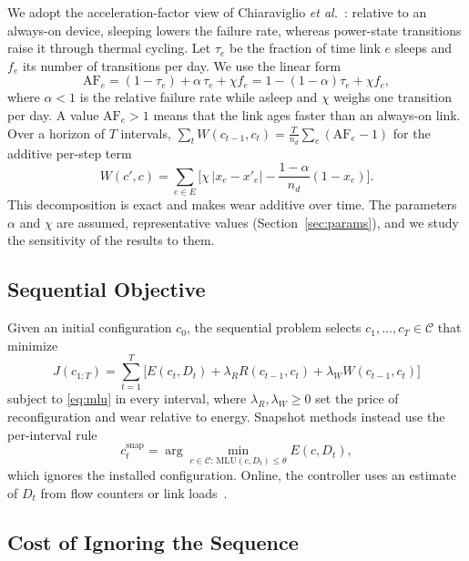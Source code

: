 \documentclass[journal]{IEEEtran}
\begin{document}
We adopt the acceleration-factor view of Chiaraviglio \emph{et al.}~\cite{chiaraviglio2015lifetime}: relative to an always-on device, sleeping lowers the failure rate, whereas power-state transitions raise it through thermal cycling. Let $\tau_e$ be the fraction of time link $e$ sleeps and $f_e$ its number of transitions per day. We use the linear form
\begin{equation}\label{eq:af}
\mathrm{AF}_e=(1-\tau_e)+\alpha\,\tau_e+\chi f_e=1-(1-\alpha)\tau_e+\chi f_e,
\end{equation}
where $\alpha<1$ is the relative failure rate while asleep and $\chi$ weighs one transition per day. A value $\mathrm{AF}_e>1$ means that the link ages faster than an always-on link. Over a horizon of $T$ intervals, $\sum_{t}W(c_{t-1},c_t)=\frac{T}{n_d}\sum_e(\mathrm{AF}_e-1)$ for the additive per-step term
\begin{equation}\label{eq:wear}
W(c',c)=\sum_{e\in E}\Big[\chi\,|x_e-x'_e|-\frac{1-\alpha}{n_d}(1-x_e)\Big].
\end{equation}
This decomposition is exact and makes wear additive over time. The parameters $\alpha$ and $\chi$ are assumed, representative values (Section~\ref{sec:params}), and we study the sensitivity of the results to them.

\subsection{Sequential Objective}

Given an initial configuration $c_0$, the sequential problem selects $c_1,\dots,c_T\in\mathcal{C}$ that minimize
\begin{equation}\label{eq:objective}
J(c_{1:T})=\sum_{t=1}^{T}\Big[E(c_t,D_t)+\lambda_R R(c_{t-1},c_t)+\lambda_W W(c_{t-1},c_t)\Big]
\end{equation}
subject to \eqref{eq:mlu} in every interval, where $\lambda_R,\lambda_W\ge0$ set the price of reconfiguration and wear relative to energy. Snapshot methods instead use the per-interval rule
\begin{equation}\label{eq:snapshot}
c^{\mathrm{snap}}_t=\arg\min_{c\in\mathcal{C}:\,\mathrm{MLU}(c,D_t)\le\theta}E(c,D_t),
\end{equation}
which ignores the installed configuration. Online, the controller uses an estimate of $D_t$ from flow counters or link loads~\cite{zhang2003tomogravity}.

\subsection{Cost of Ignoring the Sequence}
\end{document}
